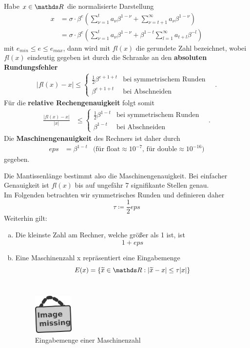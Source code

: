  \label{3.1.6}
Habe $x\in \R $ die normalisierte Darstellung
\begin{align*}
  x &= \sigma \cdot \beta^e (\sum_{\nu=1}^{t}a_{\nu}\beta^{1-\nu} + \sum_{\nu=t+1}^{\infty}a_{\nu}\beta^{1-\nu} ) \\
    &= \sigma \cdot \beta^e (\sum_{\nu=1}^{t}a_{\nu}\beta^{1-\nu} + \beta^{1-t}\sum_{l=1}^{\infty}a_{t+l}\beta^{-l} )
\end{align*}
mit $e_{min} \leq e \leq e_{max}$, dann wird mit $fl(x)$ die gerundete Zahl bezeichnet, wobei $fl(x)$ 
eindeutig gegeben ist durch die Schranke an den \textbf{absoluten Rundungsfehler} 
\begin{align*}
  | fl(x) - x | \leq \begin{cases}
    \frac{1}{2}\beta^{e+1+t} & \text{bei symmetrischem Runden}\\
    \beta^{e+1+t}                    & \text{bei Abschneiden}
  \end{cases} \quad .
\end{align*}
Für die \textbf{relative Rechengenauigkeit} folgt somit 
\begin{align*}
  \frac{| fl(x) - x | }{|x|} & \leq \begin{cases}
    \frac{1}{2}\beta^{1-t} & \text{bei symmetrischem Runden}\\
    \beta^{1-t}                    & \text{bei Abschneiden}
  \end{cases} \quad .
\end{align*}
Die \textbf{Maschinengenauigkeit}  des Rechners ist daher durch 
\begin{align*}
  eps &= \beta^{1-t} & \text{(für float}\approx 10^{-7}  \text{, für double} \approx10^{-16} )
\end{align*}
gegeben.

Die Mantissenlänge bestimmt also die Maschinengenauigkeit. Bei einfacher Genauigkeit ist $fl(x)$ bis auf ungefähr 7 signifikante Stellen genau. \\
Im Folgenden betrachten wir symmetrisches Runden und definieren daher
\[ \tau \coloneqq \frac{1}{2}eps\]
Weiterhin gilt:
\begin{enumerate}[a)]
\item Die kleinste Zahl am Rechner, welche größer als 1 ist, ist
  \[ 1 + eps \]
\item Eine Maschinenzahl x repräsentiert eine Eingabemenge
  \[  E(x) = \{\widetilde{x} \in \R : |\widetilde{x}-x| \leq \tau|x|\} \] \\
  \begin{figure}
    \parbox{\linewidth}{
      \centering
      \includegraphics[width=2cm]{images/image_missing.jpg}
    }
    \caption{Eingabemenge einer Maschinenzahl}
  \end{figure}
\end{enumerate}

